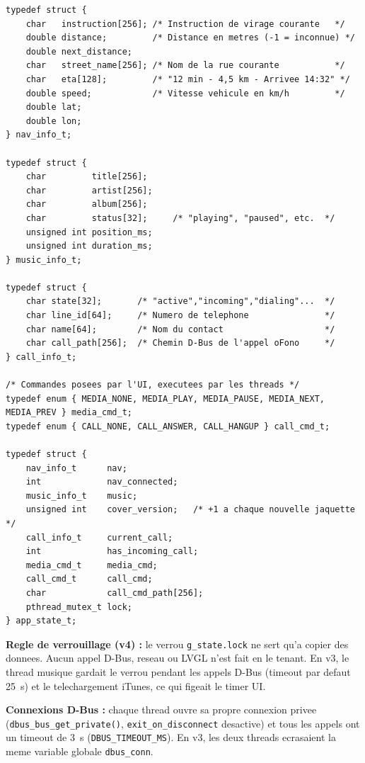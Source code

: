 \documentclass[a4paper,11pt]{article}
\begin{document}
\begin{lstlisting}[style=ccode,caption={main.c --- structures de donnees (v4)}]
typedef struct {
    char   instruction[256]; /* Instruction de virage courante   */
    double distance;         /* Distance en metres (-1 = inconnue) */
    double next_distance;
    char   street_name[256]; /* Nom de la rue courante           */
    char   eta[128];         /* "12 min - 4,5 km - Arrivee 14:32" */
    double speed;            /* Vitesse vehicule en km/h         */
    double lat;
    double lon;
} nav_info_t;

typedef struct {
    char         title[256];
    char         artist[256];
    char         album[256];
    char         status[32];     /* "playing", "paused", etc.  */
    unsigned int position_ms;
    unsigned int duration_ms;
} music_info_t;

typedef struct {
    char state[32];       /* "active","incoming","dialing"...  */
    char line_id[64];     /* Numero de telephone               */
    char name[64];        /* Nom du contact                    */
    char call_path[256];  /* Chemin D-Bus de l'appel oFono     */
} call_info_t;

/* Commandes posees par l'UI, executees par les threads */
typedef enum { MEDIA_NONE, MEDIA_PLAY, MEDIA_PAUSE, MEDIA_NEXT, MEDIA_PREV } media_cmd_t;
typedef enum { CALL_NONE, CALL_ANSWER, CALL_HANGUP } call_cmd_t;

typedef struct {
    nav_info_t      nav;
    int             nav_connected;
    music_info_t    music;
    unsigned int    cover_version;   /* +1 a chaque nouvelle jaquette */
    call_info_t     current_call;
    int             has_incoming_call;
    media_cmd_t     media_cmd;
    call_cmd_t      call_cmd;
    char            call_cmd_path[256];
    pthread_mutex_t lock;
} app_state_t;
\end{lstlisting}

\textbf{Regle de verrouillage (v4) :} le verrou \texttt{g\_state.lock} ne sert qu'a copier
des donnees. Aucun appel D-Bus, reseau ou LVGL n'est fait en le tenant. En v3, le thread
musique gardait le verrou pendant les appels D-Bus (timeout par defaut 25~s) et le
telechargement iTunes, ce qui figeait le timer UI.

\textbf{Connexions D-Bus :} chaque thread ouvre sa propre connexion privee
(\texttt{dbus\_bus\_get\_private()}, \texttt{exit\_on\_disconnect} desactive) et tous les
appels ont un timeout de 3~s (\texttt{DBUS\_TIMEOUT\_MS}). En v3, les deux threads
ecrasaient la meme variable globale \texttt{dbus\_conn}.
\end{document}
